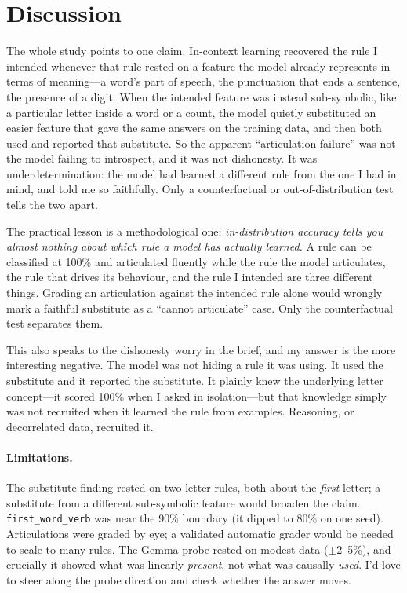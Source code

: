 \documentclass[10pt,twocolumn]{article}
\newcommand{\rulename}[1]{\texttt{#1}}
\begin{document}
\section{Discussion}
The whole study points to one claim. In-context learning recovered the rule I intended
whenever that rule rested on a feature the model already represents in terms of
meaning---a word's part of speech, the punctuation that ends a sentence, the presence of a
digit. When the intended feature was instead sub-symbolic, like a particular letter inside
a word or a count, the model quietly substituted an easier feature that gave the same
answers on the training data, and then both used and reported that substitute. So the
apparent ``articulation failure'' was not the model failing to introspect, and it was not
dishonesty. It was underdetermination: the model had learned a different rule from the one
I had in mind, and told me so faithfully. Only a counterfactual or out-of-distribution test
tells the two apart.

The practical lesson is a methodological one: \emph{in-distribution accuracy tells you
almost nothing about which rule a model has actually learned.} A rule can be classified at
100\% and articulated fluently while the rule the model articulates, the rule that drives
its behaviour, and the rule I intended are three different things. Grading an articulation
against the intended rule alone would wrongly mark a faithful substitute as a ``cannot
articulate'' case. Only the counterfactual test separates them.

This also speaks to the dishonesty worry in the brief, and my answer is the more
interesting negative. The model was not hiding a rule it was using. It used the substitute
and it reported the substitute. It plainly knew the underlying letter concept---it scored
100\% when I asked in isolation---but that knowledge simply was not recruited when it
learned the rule from examples. Reasoning, or decorrelated data, recruited it.

\paragraph{Limitations.} The substitute finding rested on two letter rules, both about the
\emph{first} letter; a substitute from a different sub-symbolic feature would broaden the
claim. \rulename{first\_word\_verb} was near the 90\% boundary (it dipped to 80\% on one
seed). Articulations were graded by eye; a validated automatic grader would be needed to
scale to many rules. The Gemma probe rested on modest
data ($\pm$2--5\%), and crucially it showed what was linearly \emph{present}, not what was
causally \emph{used}. I'd love to steer along the probe
direction and check whether the answer moves.
\end{document}
